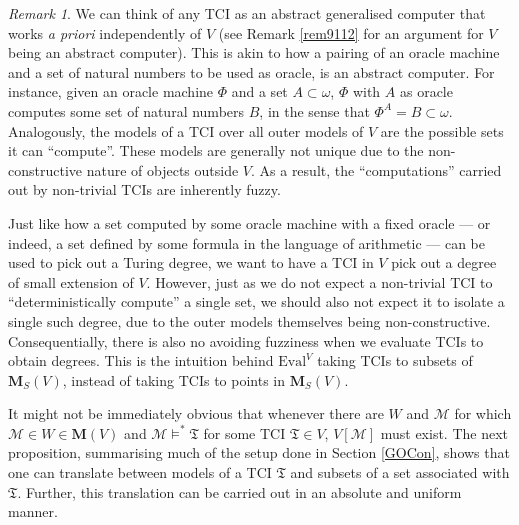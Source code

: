 \documentclass[12pt, twoside]{memoir}
\numberwithin{equation}{section}
\theoremstyle{definition}
\theoremstyle{remark}
\newtheorem{rem}[thm]{Remark}
\theoremstyle{definition}
\theoremstyle{definition}
\theoremstyle{definition}
\theoremstyle{remark}
\begin{document}
\begin{rem}\label{rem924}
We can think of any TCI as an abstract generalised computer that works \emph{a priori} independently of $V$ (see Remark \ref{rem9112} for an argument for $V$ being an abstract computer). This is akin to how a pairing of an oracle machine and a set of natural numbers to be used as oracle, is an abstract computer. For instance, given an oracle machine $\Phi$ and a set $A \subset \omega$, $\Phi$ with $A$ as oracle computes some set of natural numbers $B$, in the sense that $\Phi^A = B \subset \omega$. Analogously, the models of a TCI over all outer models of $V$ are the possible sets it can ``compute''. These models are generally not unique due to the non-constructive nature of objects outside $V$. As a result, the ``computations'' carried out by non-trivial TCIs are inherently fuzzy.

Just like how a set computed by some oracle machine with a fixed oracle --- or indeed, a set defined by some formula in the language of arithmetic --- can be used to pick out a Turing degree, we want to have a TCI in $V$ pick out a degree of small extension of $V$. However, just as we do not expect a non-trivial TCI to ``deterministically compute'' a single set, we should also not expect it to isolate a single such degree, due to the outer models themselves being non-constructive. Consequentially, there is also no avoiding fuzziness when we evaluate TCIs to obtain degrees. This is the intuition behind $\mathrm{Eval}^V$ taking TCIs to subsets of $\mathbf{M}_S(V)$, instead of taking TCIs to points in $\mathbf{M}_S(V)$.
\end{rem}

It might not be immediately obvious that whenever there are $W$ and $\mathcal{M}$ for which $\mathcal{M} \in W \in \mathbf{M}(V)$ and $\mathcal{M} \models^* \mathfrak{T}$ for some TCI $\mathfrak{T} \in V$, $V[\mathcal{M}]$ must exist. The next proposition, summarising much of the setup done in Section \ref{GOCon}, shows that one can translate between models of a TCI $\mathfrak{T}$ and subsets of a set associated with $\mathfrak{T}$. Further, this translation can be carried out in an absolute and uniform manner.
\end{document}
